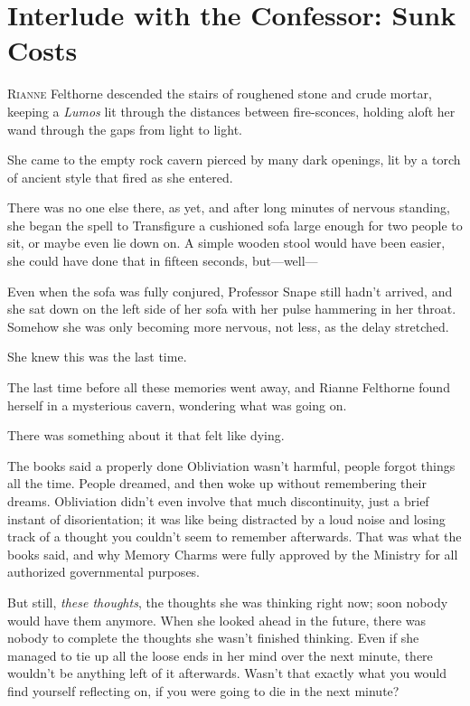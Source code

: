 \chapter{Interlude with the Confessor: Sunk Costs}

\lettrine{R}{ianne} Felthorne descended the stairs of roughened stone and crude mortar, keeping a \emph{Lumos} lit through the distances between fire-sconces, holding aloft her wand through the gaps from light to light.

She came to the empty rock cavern pierced by many dark openings, lit by a torch of ancient style that fired as she entered.

There was no one else there, as yet, and after long minutes of nervous standing, she began the spell to Transfigure a cushioned sofa large enough for two people to sit, or maybe even lie down on. A simple wooden stool would have been easier, she could have done that in fifteen seconds, but—well—

Even when the sofa was fully conjured, Professor Snape still hadn't arrived, and she sat down on the left side of her sofa with her pulse hammering in her throat. Somehow she was only becoming more nervous, not less, as the delay stretched.

She knew this was the last time.

The last time before all these memories went away, and Rianne Felthorne found herself in a mysterious cavern, wondering what was going on.

There was something about it that felt like dying.

The books said a properly done Obliviation wasn't harmful, people forgot things all the time. People dreamed, and then woke up without remembering their dreams. Obliviation didn't even involve that much discontinuity, just a brief instant of disorientation; it was like being distracted by a loud noise and losing track of a thought you couldn't seem to remember afterwards. That was what the books said, and why Memory Charms were fully approved by the Ministry for all authorized governmental purposes.

But still, \emph{these thoughts}, the thoughts she was thinking right now; soon nobody would have them anymore. When she looked ahead in the future, there was nobody to complete the thoughts she wasn't finished thinking. Even if she managed to tie up all the loose ends in her mind over the next minute, there wouldn't be anything left of it afterwards. Wasn't that exactly what you would find yourself reflecting on, if you were going to die in the next minute?

